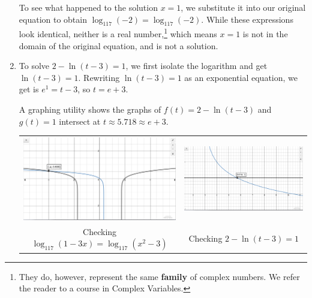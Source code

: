 \begin{ex}
\begin{enumerate}
\smallskip

To see what happened to the solution $x=1$, we substitute it into our original equation to obtain  $\log_{117}(-2) =  \log_{117}(-2)$.  While these expressions look identical, neither is a real number,\footnote{They do, however, represent the same \textbf{family} of complex numbers.  We refer the reader to a course in Complex Variables.} which means $x=1$ is not in the domain of the original equation, and is not a solution.    


\item  To solve  $2 - \ln(t-3) = 1$, we first isolate the logarithm and get $\ln(t-3) = 1$. Rewriting $\ln(t-3) = 1$ as an exponential equation, we get is $e^{1} = t-3$, so $t =e+3$. 

\smallskip

A graphing utility shows the graphs of $f(t) = 2 - \ln(t-3)$ and $g(t) = 1$ intersect at $t \approx   5.718 \approx e+3$.

\begin{center}

\begin{tabular}{cc}

\includegraphics[width=3in]{./LogarithmicEquationsandInequalitiesGraphics/LogEqnEx01.jpg} &

\includegraphics[width=3in]{./LogarithmicEquationsandInequalitiesGraphics/LogEqnEx02.jpg}  \\

Checking $\log_{117}(1-3x) = \log_{117}\left(x^2-3\right)$
 
 &
 
 Checking $2 - \ln(t-3) = 1$
 
\end{tabular}


\end{center}
\end{enumerate}
\end{ex}
